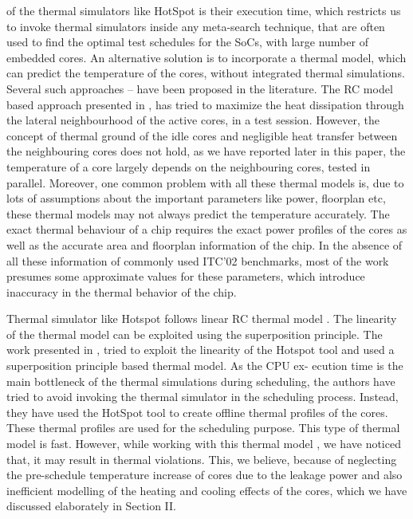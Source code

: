 \documentclass[conference]{IEEEtran}
\begin{document}
of the thermal simulators like HotSpot \cite{stan2003hotspot} is their execution
time, which restricts us to invoke thermal simulators inside any
meta-search technique, that are often used to find the optimal
test schedules for the SoCs, with large number of embedded
cores. An alternative solution is to incorporate a thermal
model, which can predict the temperature of the cores, without
integrated thermal simulations. Several such approaches \cite{yu2007thermal}–
\cite{he2007heuristic} have been proposed in the literature. The RC model based
approach presented in \cite{rosinger2006thermal}, has tried to maximize the heat
dissipation through the lateral neighbourhood of the active
cores, in a test session. However, the concept of thermal
ground of the idle cores and negligible heat transfer between
the neighbouring cores does not hold, as we have reported
later in this paper, the temperature of a core largely depends
on the neighbouring cores, tested in parallel. Moreover, one
common problem with all these thermal models is, due to lots
of assumptions about the important parameters like power,
floorplan etc, these thermal models may not always predict
the temperature accurately. The exact thermal behaviour of a
chip requires the exact power profiles of the cores as well as
the accurate area and floorplan information of the chip. In the
absence of all these information of commonly used ITC’02
benchmarks, most of the work presumes some approximate
values for these parameters, which introduce inaccuracy in the
thermal behavior of the chip.\\
	\par 
	Thermal simulator like Hotspot follows linear RC thermal
model \cite{yao2011power}. The linearity of the thermal model can be exploited
using the superposition principle. The work presented in \cite{yao2011power},
tried to exploit the linearity of the Hotspot tool and used a
superposition principle based thermal model. As the CPU ex-
ecution time is the main bottleneck of the thermal simulations
during scheduling, the authors have tried to avoid invoking the
thermal simulator in the scheduling process. Instead, they have
used the HotSpot \cite{stan2003hotspot} tool to create offline thermal profiles of
the cores. These thermal profiles are used for the scheduling
purpose. This type of thermal model is fast. However, while
working with this thermal model \cite{yao2011power}, we have noticed that,
it may result in thermal violations. This, we believe, because
of neglecting the pre-schedule temperature increase of cores
due to the leakage power and also inefficient modelling of
the heating and cooling effects of the cores, which we have
discussed elaborately in Section II.\\
\end{document}
